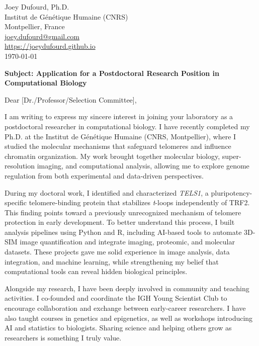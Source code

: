 \documentclass[11pt,a4paper]{article}
\begin{document}
\begin{flushright}
Joey Dufourd, Ph.D.\\
Institut de Génétique Humaine (CNRS)\\
Montpellier, France\\
\href{mailto:joey.dufourd@gmail.com}{joey.dufourd@gmail.com}\\
\href{https://joeydufourd.github.io}{https://joeydufourd.github.io}\\
\vspace{0.4cm}
\today
\end{flushright}

\vspace{0.4cm}
\noindent
\textbf{Subject: Application for a Postdoctoral Research Position in Computational Biology}

\vspace{0.5cm}
Dear [Dr./Professor/Selection Committee],

\vspace{0.3cm}
I am writing to express my sincere interest in joining your laboratory as a postdoctoral researcher in computational biology. I have recently completed my Ph.D. at the Institut de Génétique Humaine (CNRS, Montpellier), where I studied the molecular mechanisms that safeguard telomeres and influence chromatin organization. My work brought together molecular biology, super-resolution imaging, and computational analysis, allowing me to explore genome regulation from both experimental and data-driven perspectives.

During my doctoral work, I identified and characterized \textit{TELS1}, a pluripotency-specific telomere-binding protein that stabilizes \textit{t}-loops independently of TRF2. This finding points toward a previously unrecognized mechanism of telomere protection in early development. To better understand this process, I built analysis pipelines using Python and R, including AI-based tools to automate 3D-SIM image quantification and integrate imaging, proteomic, and molecular datasets. These projects gave me solid experience in image analysis, data integration, and machine learning, while strengthening my belief that computational tools can reveal hidden biological principles.

Alongside my research, I have been deeply involved in community and teaching activities. I co-founded and coordinate the IGH Young Scientist Club to encourage collaboration and exchange between early-career researchers. I have also taught courses in genetics and epigenetics, as well as workshops introducing AI and statistics to biologists. Sharing science and helping others grow as researchers is something I truly value.
\end{document}
